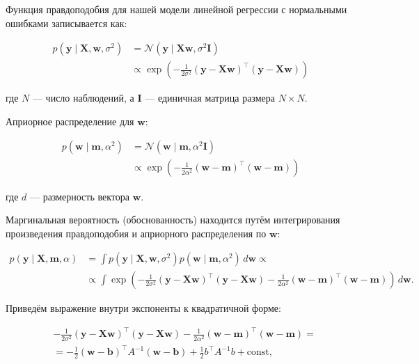 Функция правдоподобия для нашей модели линейной регрессии с нормальными ошибками записывается как:

\begin{align*}
 p(\mathbf{y} \mid \mathbf{X}, \mathbf{w}, \sigma^2) &= \mathcal{N}(\mathbf{y} \mid \mathbf{X}\mathbf{w}, \sigma^2 \mathbf{I}) \\
 &\propto \exp\left(-\frac{1}{2\sigma^2}(\mathbf{y} - \mathbf{X}\mathbf{w})^\top(\mathbf{y} - \mathbf{X}\mathbf{w})\right)
\end{align*}

где $N$ — число наблюдений, а $\mathbf{I}$ — единичная матрица размера $N \times N$.

Априорное распределение для $\mathbf{w}$:

\begin{align*}
 p(\mathbf{w} \mid \mathbf{m}, \alpha^2) &= \mathcal{N}(\mathbf{w} \mid \mathbf{m}, \alpha^2 \mathbf{I}) \\
 &\propto \exp\left(-\frac{1}{2\alpha^2}(\mathbf{w} - \mathbf{m})^\top(\mathbf{w} - \mathbf{m})\right)
\end{align*}

где $d$ — размерность вектора $\mathbf{w}$.

Маргинальная вероятность (обоснованность) находится путём интегрирования произведения правдоподобия и априорного распределения по $\mathbf{w}$:

\begin{align*}
 p(\mathbf{y} \mid \mathbf{X}, \mathbf{m}, \alpha) &= \int p(\mathbf{y} \mid \mathbf{X}, \mathbf{w}, \sigma^2) p(\mathbf{w} \mid \mathbf{m}, \alpha^2) \, d\mathbf{w} \propto \\
 &\propto \int \exp\left(-\frac{1}{2\sigma^2}(\mathbf{y} - \mathbf{X}\mathbf{w})^\top(\mathbf{y} - \mathbf{X}\mathbf{w}) - \frac{1}{2\alpha^2}(\mathbf{w} - \mathbf{m})^\top(\mathbf{w} - \mathbf{m})\right) \, d\mathbf{w}.
\end{align*}

Приведём выражение внутри экспоненты к квадратичной форме:

\begin{align*}
 &-\frac{1}{2\sigma^2}(\mathbf{y} - \mathbf{X}\mathbf{w})^\top(\mathbf{y} - \mathbf{X}\mathbf{w}) - \frac{1}{2\alpha^2}(\mathbf{w} - \mathbf{m})^\top(\mathbf{w} - \mathbf{m})= \\
 &= -\frac{1}{2}(\mathbf{w} - \mathbf{b})^\top A^{-1} (\mathbf{w} - \mathbf{b}) + \frac{1}{2} b^\top A^{-1} b + \text{const},
\end{align*}

